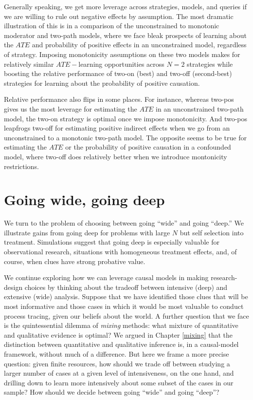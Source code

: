 \documentclass[
  12pt,
]{book}
\newenvironment{headerbox}{
  \definecolor{shadecolor}{rgb}{0.8, 0.8, 0.8}  %
  \color{black}
  \begin{shaded}}{\end{shaded}}
\begin{document}
Generally speaking, we get more leverage across strategies, models, and queries if we are willing to rule out negative effects by assumption. The most dramatic illustration of this is in a comparison of the unconstrained to monotonic moderator and two-path models, where we face bleak prospects of learning about the \(ATE\) and probability of positive effects in an unconstrained model, regardless of strategy. Imposing monotonicity assumptions on these two models makes for relatively similar \(ATE-\)learning opportunities across \(N=2\) strategies while boosting the relative performance of two-on (best) and two-off (second-best) strategies for learning about the probability of positive causation.

Relative performance also flips in some places. For instance, whereas two-pos gives us the most leverage for estimating the \(ATE\) in an unconstrained two-path model, the two-on strategy is optimal once we impose monotonicity. And two-pos leapfrogs two-off for estimating positive indirect effects when we go from an unconstrained to a monotonic two-path model. The opposite seems to be true for estimating the \(ATE\) or the probability of positive causation in a confounded model, where two-off does relatively better when we introduce montonicity restrictions.

\hypertarget{wideordeep}{%
\chapter{Going wide, going deep}\label{wideordeep}}

\begin{headerbox}
We turn to the problem of choosing between going ``wide'' and going ``deep.'' We illustrate gains from going deep for problems with large \(N\) but self selection into treatment. Simulations suggest that going deep is especially valuable for observational research, situations with homogeneous treatment effects, and, of course, when clues have strong probative value.

\end{headerbox}

We continue exploring how we can leverage causal models in making research-design choices by thinking about the tradeoff between intensive (deep) and extensive (wide) analysis. Suppose that we have identified those clues that will be most informative and those cases in which it would be most valuable to conduct process tracing, given our beliefs about the world. A further question that we face is the quintessential dilemma of \emph{mixing} methods: what mixture of quantitative and qualitative evidence is optimal? We argued in Chapter \ref{mixing} that the distinction between quantitative and qualitative inference is, in a causal-model framework, without much of a difference. But here we frame a more precise question: given finite resources, how should we trade off between studying a larger number of cases at a given level of intensiveness, on the one hand, and drilling down to learn more intensively about some subset of the cases in our sample? How should we decide between going ``wide'' and going ``deep''?
\end{document}
